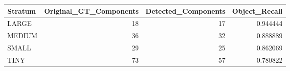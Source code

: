 \begin{tabular}{lrrr}
\toprule
Stratum & Original_GT_Components & Detected_Components & Object_Recall \\
\midrule
LARGE & 18 & 17 & 0.944444 \\
MEDIUM & 36 & 32 & 0.888889 \\
SMALL & 29 & 25 & 0.862069 \\
TINY & 73 & 57 & 0.780822 \\
\bottomrule
\end{tabular}
